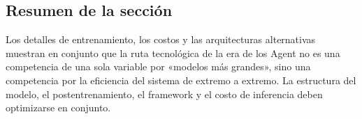 \subsection{Resumen de la sección}

Los detalles de entrenamiento, los costos y las arquitecturas alternativas muestran en conjunto que la ruta tecnológica de la era de los Agent no es una competencia de una sola variable por «modelos más grandes», sino una competencia por la eficiencia del sistema de extremo a extremo. La estructura del modelo, el postentrenamiento, el framework y el costo de inferencia deben optimizarse en conjunto.
